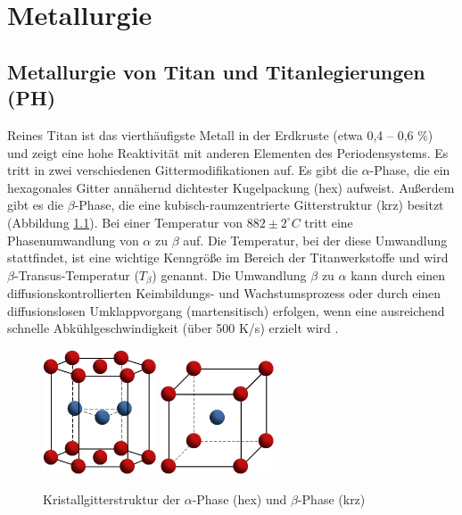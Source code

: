 \chapter{Metallurgie}	

\section{Metallurgie von Titan und Titanlegierungen (PH)}
Reines Titan ist das vierthäufigste Metall in der Erdkruste (etwa 0,4 -- 0,6 \%) und zeigt eine hohe Reaktivität mit anderen Elementen des Periodensystems. Es tritt in zwei verschiedenen Gittermodifikationen auf. Es gibt die $\alpha$-Phase, die ein hexagonales Gitter annähernd dichtester Kugelpackung (hex) aufweist. Außerdem gibt es die $\beta$-Phase, die eine kubisch-raumzentrierte Gitterstruktur (krz) besitzt (Abbildung \ref{fig:Kristallgitter}). Bei einer Temperatur von $882 \pm 2 ^\circ C$ tritt eine Phasenumwandlung von $\alpha$ zu $\beta$ auf. Die Temperatur, bei der diese Umwandlung stattfindet, ist eine wichtige Kenngröße im Bereich der Titanwerkstoffe und wird $\beta$-Transus-Temperatur ($T_{\beta}$) genannt.
Die Umwandlung $\beta$ zu $\alpha$ kann durch einen diffusionskontrollierten Keimbildungs- und Wachstumsprozess oder durch einen diffusionslosen Umklappvorgang (martensitisch) erfolgen, wenn eine ausreichend schnelle Abkühlgeschwindigkeit (über 500 K/s) erzielt wird \cite{C.Leyens.2005,Lutjering.2007}.

\begin{figure}[h]
	\centering
	\subfloat{}
	\includegraphics[width=0.3\textwidth]{./Bilder/hcp}
	\hspace{4ex}
	\subfloat{}
	\includegraphics[width=0.3\textwidth]{Bilder/krz}
	\caption{Kristallgitterstruktur der $\alpha$-Phase (hex) und $\beta$-Phase (krz)}
	\label{fig:Kristallgitter}
\end{figure}

